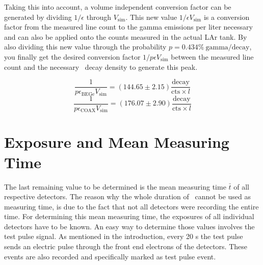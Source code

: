 \documentclass[encoding=utf8,british]{tumphthesis}
\begin{document}
Taking this into account, a volume independent conversion factor can be generated by dividing $1 / \epsilon$ through $V_{\mathrm{sim}}$.
This new value $1 / \epsilon V_{\mathrm{sim}}$ is a conversion factor from the measured line count to the gamma emissions per liter necessary and can also be applied onto the counts measured in the actual LAr tank.
By also dividing this new value through the probability $p=0.434\% ~\mathrm{gamma} /  \mathrm{decay}$, you finally get the desired conversion factor $1 / p\epsilon V_ {\mathrm{sim}}$ between the measured line count and the necessary \Kr\ decay density to generate this peak. 
 
\begin{equation*}
\frac{1}{ p \epsilon_{\mathrm{BEGe}} V_{\mathrm{sim}}} = (144.65\pm2.15) \frac{\mathrm{decay}}{\mathrm{cts}\times \unit{l}}
\end{equation*}
\begin{equation*}
\frac{1}{p \epsilon_{\mathrm{COAX}} V_{\mathrm{sim}}} = (176.07\pm2.90) \frac{\mathrm{decay}}{\mathrm{cts} \times \unit{l}}
\end{equation*}

\section{Exposure and Mean Measuring Time}
\label{sec:CalcActiv}

The last remaining value to be determined is the mean measuring time $\bar{t}$ of all respective detectors.
The reason why the whole duration of \PII\ cannot be used as measuring time, is due to the fact that not all detectors were recording the entire time.
For determining this mean measuring time, the exposures of all individual detectors have to be known.
An easy way to determine those values involves the test pulse signal.
As mentioned in the introduction, every 20 s the test pulse sends an electric pulse through the front end electrons of the detectors.
These events are also recorded and specifically marked as test pulse event. 
\\
\end{document}
